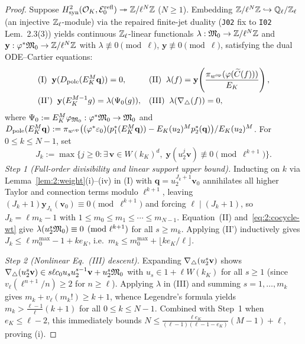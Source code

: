 \begin{proof}
Suppose $H^2_{\mathrm{syn}}(\mathcal{O}_K, \mathcal{E}_0^{\mathrm{refl}}) \twoheadrightarrow \mathbb{Z}/\ell^N\mathbb{Z}$ ($N \ge 1$). Embedding $\mathbb{Z}/\ell^N\mathbb{Z} \hookrightarrow \mathbb{Q}_\ell/\mathbb{Z}_\ell$ (an injective $\mathbb{Z}_\ell$-module) via the repaired finite-jet duality (\texttt{J02} fix to \texttt{I02} Lem.~2.3(3)) yields continuous $\mathbb{Z}_\ell$-linear functionals $\lambda : \mathfrak{M}_0 \to \mathbb{Z}/\ell^N\mathbb{Z}$ and $\mathbf{y} : \varphi^*\mathfrak{M}_0 \to \mathbb{Z}/\ell^N\mathbb{Z}$ with $\lambda \not\equiv 0 \pmod{\ell}$, $\mathbf{y} \not\equiv 0 \pmod{\ell}$, satisfying the dual ODE--Cartier equations:
\begin{align*}
  &\text{(I)}\;\; \mathbf{y}(D_{\mathrm{pole}}(E_K^M \mathbf{q})) = 0, &
  &\text{(II)}\;\; \lambda(f) = \mathbf{y}\!\left(\frac{\pi_{w^{\mathrm{op}}}(\varphi(\widetilde{C}(f)))}{E_K}\right),\\
  &\text{(II')}\;\; \mathbf{y}(E_K^{M-1} g) = \lambda(\Psi_0(g)), &
  &\text{(III)}\;\; \lambda(\nabla_{\triangle}(f)) = 0,
\end{align*}
where $\Psi_0 := E_K^M \varphi_{\mathfrak{M}_0} : \varphi^*\mathfrak{M}_0 \to \mathfrak{M}_0$ and $D_{\mathrm{pole}}(E_K^M\mathbf{q}) := \pi_{w^{\mathrm{op}}}\bigl((\varphi^* \varepsilon_0)(p_1^*(E_K^M\mathbf{q})) - E_K(u_2)^M p_2^*(\mathbf{q})\bigr) / E_K(u_2)^M$. For $0 \le k \le N-1$, set
\[
  J_k := \max\bigl\{j \ge 0 : \exists\,\mathbf{v} \in W(k_K)^d,\; \mathbf{y}(u_2^j \mathbf{v}) \not\equiv 0 \pmod{\ell^{k+1}}\bigr\}.
\]
\emph{Step 1 (Full-order divisibility and linear support upper bound).} Inducting on $k$ via Lemma~\ref{lem:2:weight}(i)--(iv) in (I) with $\mathbf{q} = u_2^{J_k+1}\mathbf{v}_0$ annihilates all higher Taylor and connection terms modulo $\ell^{k+1}$, leaving $(J_k + 1)\mathbf{y}_{J_k}(\mathbf{v}_0) \equiv 0 \pmod{\ell^{k+1}}$ and forcing $\ell \mid (J_k + 1)$, so $J_k = \ell m_k - 1$ with $1 \le m_0 \le m_1 \le \cdots \le m_{N-1}$. Equation~(II) and~\eqref{eq:2:cocycle-wt} give $\lambda(u_2^s \mathfrak{M}_0) \equiv 0 \pmod{\ell^{k+1}}$ for all $s \ge m_k$. Applying (II') inductively gives $J_k \le \ell m_0^{\max} - 1 + k e_K$, i.e.\ $m_k \le m_0^{\max} + \lfloor k e_K/\ell \rfloor$.

\emph{Step 2 (Nonlinear Eq.~(III) descent).} Expanding $\nabla_{\triangle}(u_2^s\mathbf{v})$ shows $\nabla_{\triangle}(u_2^s\mathbf{v}) \in s\ell c_0 u_s u_2^{s-1}\mathbf{v} + u_2^s\mathfrak{M}_0$ with $u_s \in 1 + \ell W(k_K)$ for all $s \ge 1$ (since $v_\ell(\ell^{n+1}/n) \ge 2$ for $n \ge \ell$). Applying $\lambda$ in (III) and summing $s = 1, \dots, m_k$ gives $m_k + v_\ell(m_k!) \ge k + 1$, whence Legendre's formula yields $m_k > \frac{\ell-1}{\ell}(k+1)$ for all $0 \le k \le N-1$. Combined with Step~1 when $e_K \le \ell - 2$, this immediately bounds $N \le \frac{\ell e_K}{(\ell-1)(\ell-1-e_K)}(M-1) + \ell$, proving (i).


\end{proof}
